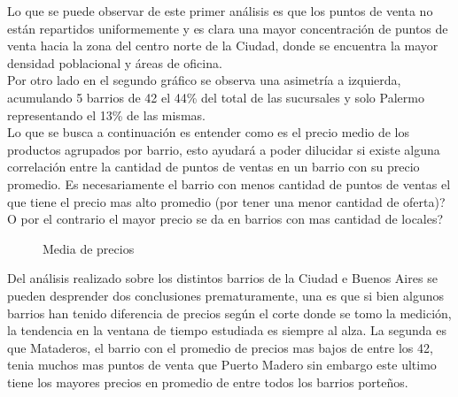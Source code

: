 Lo que se puede observar de este primer análisis es que los puntos de venta no están repartidos uniformemente y es clara una mayor concentración de puntos de venta hacia la zona del centro norte de la Ciudad, donde se encuentra la mayor densidad poblacional \cite{densidad} y áreas de oficina.\\
Por otro lado en el segundo gráfico se observa una asimetría a izquierda, acumulando 5 barrios de 42 el 44\% del total de las sucursales y solo Palermo representando el 13\% de las mismas.\\


Lo que se busca a continuación es entender como es el precio medio de los productos agrupados por barrio, esto ayudará a poder dilucidar si existe alguna correlación entre la cantidad de puntos de ventas en un barrio con su precio promedio.
Es necesariamente el barrio con menos cantidad de puntos de ventas el que tiene el precio mas alto promedio (por tener una menor cantidad de oferta)?\\
O por el contrario el mayor precio se da en barrios con mas cantidad de locales?\\


\begin{figure}[h]
\centering
{}%
\caption{Media de precios}
\label{media_precios}
\end{figure}

Del análisis realizado sobre los distintos barrios de la Ciudad e Buenos Aires se pueden desprender dos conclusiones prematuramente, una es que si bien algunos barrios han tenido diferencia de precios según el corte donde se tomo la medición, la tendencia en la ventana de tiempo estudiada es siempre al alza. La segunda es que Mataderos, el barrio con el promedio de precios mas bajos de entre los 42, tenia muchos mas puntos de venta que Puerto Madero sin embargo este ultimo tiene los mayores precios en promedio de entre todos los barrios porteños. \\


